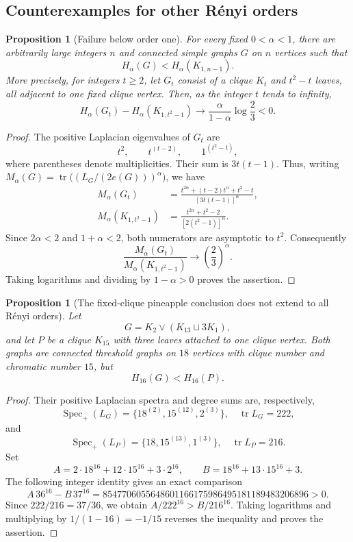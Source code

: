 \documentclass[11pt,a4paper,reqno]{amsart}
\newtheorem{proposition}[theorem]{Proposition}
\theoremstyle{remark}
\numberwithin{equation}{section}
\begin{document}
\subsection{Counterexamples for other R\'enyi orders}
\begin{proposition}[Failure below order one]
\label{prop:renyi-below-one-counterexample}
For every fixed $0<\alpha<1$, there are arbitrarily large integers $n$
and connected simple graphs $G$ on $n$ vertices such that
\[
 H_\alpha(G)<H_\alpha(K_{1,n-1}).
\]
More precisely, for integers $t\ge2$, let $G_t$ consist of a clique
$K_t$ and $t^2-t$ leaves,
all adjacent to one fixed clique vertex. Then, as the integer $t$ tends
to infinity,
\[
 H_\alpha(G_t)-H_\alpha(K_{1,t^2-1})
 \longrightarrow
 \frac{\alpha}{1-\alpha}\log\frac23<0.
\]
\end{proposition}

\begin{proof}
The positive Laplacian eigenvalues of $G_t$ are
\[
 t^2,\qquad t^{(t-2)},\qquad 1^{(t^2-t)},
\]
where parentheses denote multiplicities. Their sum is
$3t(t-1)$. Thus, writing $M_\alpha(G)=\operatorname{tr}\bigl((L_G/(2e(G)))^\alpha\bigr)$,
we have
\begin{align*}
 M_\alpha(G_t)
 &=\frac{t^{2\alpha}+(t-2)t^\alpha+t^2-t}
          {[3t(t-1)]^\alpha},\\
 M_\alpha(K_{1,t^2-1})
 &=\frac{t^{2\alpha}+t^2-2}
          {[2(t^2-1)]^\alpha}.
\end{align*}
Since $2\alpha<2$ and $1+\alpha<2$, both numerators are asymptotic
to $t^2$. Consequently
\[
 \frac{M_\alpha(G_t)}{M_\alpha(K_{1,t^2-1})}
 \longrightarrow \left(\frac23\right)^\alpha.
\]
Taking logarithms and dividing by $1-\alpha>0$ proves the assertion.
\end{proof}

\begin{proposition}[The fixed-clique pineapple conclusion does not
extend to all R\'enyi orders]
\label{prop:renyi-fixed-clique-counterexample}
Let
\[
 G=K_2\vee(K_{13}\sqcup3K_1),
\]
and let $P$ be a clique $K_{15}$ with three leaves attached to one
clique vertex. Both graphs are connected threshold graphs on $18$
vertices with clique number and chromatic number $15$, but
\[
 H_{16}(G)<H_{16}(P).
\]
\end{proposition}

\begin{proof}
Their positive Laplacian spectra and degree sums are, respectively,
\[
 \operatorname{Spec}_+(L_G)=\{18^{(2)},15^{(12)},2^{(3)}\},
 \quad \operatorname{tr}L_G=222,
\]
and
\[
 \operatorname{Spec}_+(L_P)=\{18,15^{(13)},1^{(3)}\},
 \quad \operatorname{tr}L_P=216.
\]
Set
\[
 A=2\cdot18^{16}+12\cdot15^{16}+3\cdot2^{16},\qquad
 B=18^{16}+13\cdot15^{16}+3.
\]
The following integer identity gives an exact comparison
\[
 A\,36^{16}-B\,37^{16}
 =8547706055648601166175986495181189483206896>0.
\]
Since $222/216=37/36$, we obtain
$A/222^{16}>B/216^{16}$. Taking logarithms and multiplying by
$1/(1-16)=-1/15$ reverses the inequality and proves the assertion.
\end{proof}
\end{document}
